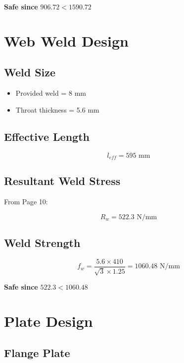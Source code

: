 \textbf{Safe since } $906.72 < 1590.72$

\section{Web Weld Design}

\subsection{Weld Size}

\begin{itemize}
    \item Provided weld = 8 mm
    \item Throat thickness = 5.6 mm
\end{itemize}

\subsection{Effective Length}

\begin{equation}
l_{eff} = 595 \text{ mm}
\end{equation}

\subsection{Resultant Weld Stress}

From Page 10:

\begin{equation}
R_w = 522.3 \text{ N/mm}
\end{equation}

\subsection{Weld Strength}

\begin{equation}
f_w = \frac{5.6 \times 410}{\sqrt{3} \times 1.25} = 1060.48 \text{ N/mm}
\end{equation}

\textbf{Safe since } $522.3 < 1060.48$

\section{Plate Design}

\subsection{Flange Plate}

